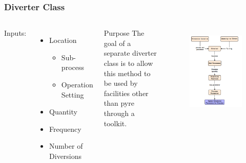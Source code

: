 \begin{frame}
	\frametitle{Diverter Class}
	\begin{columns}
		\column[t]{5cm}
		Inputs:
		\begin{itemize}
			\item Location
			\begin{itemize}
				\item Sub-process
				\item Operation Setting
			\end{itemize}
			\item Quantity
			\item Frequency
			\item Number of Diversions
		\end{itemize}
		\begin{block}{Purpose}
			The goal of a separate diverter class is to allow this method to be used by facilities other
			than pyre through a toolkit.
		\end{block}
		\column[t]{6cm}
		\begin{figure}
			\includegraphics[width=0.8\linewidth]{images/diverter}
			\label{fig:diverter}
		\end{figure}
	\end{columns}
\end{frame}

